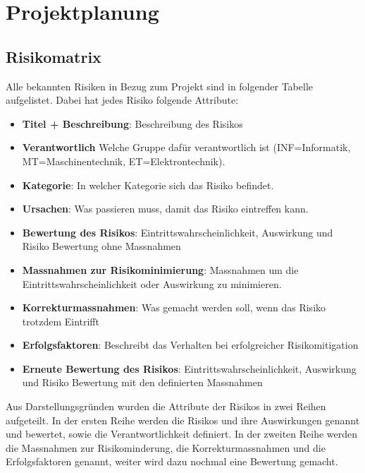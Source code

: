 \documentclass[../main.tex]{subfiles}
\begin{document}
\newpage
\section{Projektplanung}

\subsection{Risikomatrix} \label{risikomatrix}

Alle bekannten Risiken in Bezug zum Projekt sind in folgender Tabelle aufgelistet.
Dabei hat jedes Risiko folgende Attribute:
\begin{itemize}
    \item \textbf{Titel + Beschreibung}: Beschreibung des Risikos
    \item \textbf{Verantwortlich} Welche Gruppe dafür verantwortlich ist (INF=Informatik, MT=Maschinentechnik, ET=Elektrontechnik).
    \item \textbf{Kategorie}: In welcher Kategorie sich das Risiko befindet.
    \item \textbf{Ursachen}: Was passieren muss, damit das Risiko eintreffen kann.
    \item \textbf{Bewertung des Risikos}: Eintrittswahrscheinlichkeit, Auswirkung und Risiko Bewertung ohne Massnahmen
    \item \textbf{Massnahmen zur Risikominimierung}: Massnahmen um die Eintrittswahrscheinlichkeit oder Auswirkung zu minimieren.
    \item \textbf{Korrekturmassnahmen}: Was gemacht werden soll, wenn das Risiko trotzdem Eintrifft
    \item \textbf{Erfolgsfaktoren}: Beschreibt das Verhalten bei erfolgreicher Risikomitigation
    \item \textbf{Erneute Bewertung des Risikos}: Eintrittswahrscheinlichkeit, Auswirkung und Risiko Bewertung mit den definierten Massnahmen
\end{itemize}

Aus Darstellungsgründen wurden die Attribute der Risikos in zwei Reihen aufgeteilt. In der ersten Reihe werden die Risikos und ihre Auswirkungen genannt und bewertet, sowie die Verantwortlichkeit definiert. In der zweiten Reihe werden die Massnahmen zur Risikominderung, die Korrekturmassnahmen und die Erfolgsfaktoren genannt, weiter wird dazu nochmal eine Bewertung gemacht.
\end{document}

